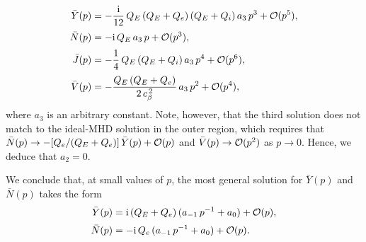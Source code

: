 \documentclass[12pt,prb,aps]{revtex4-1}
\begin{document}
\begin{align}
\bar{Y}(p)& =- \frac{{\rm i}}{12}\,Q_E\,(Q_E+Q_e)\,(Q_E+Q_i)\,a_3\,p^3+{\cal O}(p^5),\\[0.5ex]
\bar{N}(p) &=-{\rm i}\, Q_E\,a_3\,p+{\cal O}(p^3),\\[0.5ex]
\bar{J}(p)&= -\frac{1}{4}\,Q_E\,(Q_E+Q_i)\,a_3\,p^4+{\cal O}(p^6),\\[0.5ex]
\bar{V}(p) &=- \frac{Q_E\,(Q_E+Q_e)}{2\,c_\beta^{\,2}}\,a_3\,p^2+{\cal O}(p^4),
\end{align}
where $a_3$ is an arbitrary constant. Note, however, that the third solution does not match to the ideal-MHD solution in the outer region, which requires that 
$\bar{N}(p) \rightarrow- [Q_e/(Q_E+Q_e)]\,\bar{Y}(p) + {\cal O}(p)$ and  $\bar{V}(p)\rightarrow {\cal O}(p^2)$
as $p\rightarrow 0$. Hence, we deduce that $a_2=0$. 

We conclude that, at small values of $p$, the most general solution for $\bar{Y}(p)$ and $\bar{N}(p)$ takes the form 
\begin{align}\label{yy}
\bar{Y}(p) &= {\rm i}\,(Q_E+Q_e)\,(a_{-1} \,p^{-1}+a_0)+ {\cal O}(p),\\[0.5ex]
\bar{N}(p) &= -{\rm i}\,Q_e\,(a_{-1}\,p^{-1} +a_0)+ {\cal O}(p).\label{nn}
\end{align}
\end{document}
